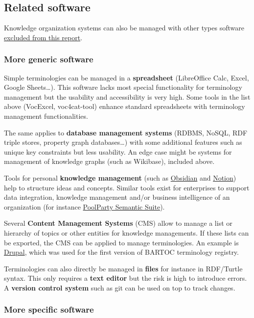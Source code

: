 \documentclass[
  DIV=10]{article}
\begin{document}
\subsection{Related software}\label{related-software}

Knowledge organization systems can also be managed with other types
software \hyperref[scope]{excluded from this report}.

\subsubsection{More generic software}\label{more-generic-software}

Simple terminologies can be managed in a \textbf{spreadsheet}
(LibreOffice Calc, Excel, Google Sheets\ldots). This software lacks most
special functionality for terminology management but the usability and
accessibility is very high. Some tools in the list above (VocExcel,
voc4cat-tool) enhance standard spreadsheets with terminology management
functionalities.

The same applies to \textbf{database management systems} (RDBMS, NoSQL,
RDF triple stores, property graph databases\ldots) with some additional
features such as unique key constraints but less usability. An edge case
might be systems for management of knowledge graphs (such as Wikibase),
included above.

Tools for personal \textbf{knowledge management} (such as
\href{https://obsidian.md/}{Obsidian} and
\href{https://www.notion.com/}{Notion}) help to structure ideas and
concepts. Similar tools exist for enterprises to support data
integration, knowledge management and/or business intelligence of an
organization (for instance
\href{https://www.poolparty.biz/product-overview}{PoolParty Semantic
Suite}).

Several \textbf{Content Management Systems} (CMS) allow to manage a list
or hierarchy of topics or other entities for knowledge managements. If
these lists can be exported, the CMS can be applied to manage
terminologies. An example is \href{https://www.drupal.org/}{Drupal},
which was used for the first version of BARTOC terminology registry.

Terminologies can also directly be managed in \textbf{files} for
instance in RDF/Turtle syntax. This only requires a \textbf{text editor}
but the risk is high to introduce errors. A \textbf{version control
system} such as git can be used on top to track changes.

\subsubsection{More specific software}\label{more-specific-software}
\end{document}
